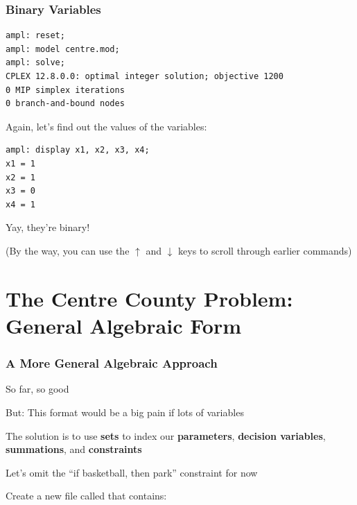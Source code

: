 \begin{frame}[fragile]

	\frametitle{Binary Variables}
	
\begin{lstlisting}
ampl: reset;
ampl: model centre.mod;
ampl: solve;
CPLEX 12.8.0.0: optimal integer solution; objective 1200
0 MIP simplex iterations
0 branch-and-bound nodes
\end{lstlisting}

	\bit
	\item Again, let's find out the values of the variables:
	\eit
	
\begin{lstlisting}
ampl: display x1, x2, x3, x4;
x1 = 1
x2 = 1
x3 = 0
x4 = 1
\end{lstlisting}

	\bit
	\item Yay, they're binary!
	\item (By the way, you can use the $\uparrow$ and $\downarrow$ keys to scroll through earlier commands)
	\eit

\end{frame}



\section{The Centre County Problem: General Algebraic Form}

\begin{frame}[fragile]

	\frametitle{A More General Algebraic Approach}
	
	\bit
	\item So far, so good
	\item But: This format would be a big pain if lots of variables
	\item The solution is to use {\bf sets} to index our {\bf parameters}, {\bf decision variables}, {\bf summations}, and {\bf constraints}
	\item Let's omit the ``if basketball, then park'' constraint for now
	\item Create a new file called  that contains:
	\eit



\end{frame}


